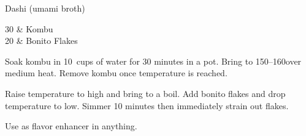 
\begin{recipe}{Dashi (umami broth)}\label{dashi}
  \servings{}
  \maketitle

  \begin{ingredients2}
    30 \g & Kombu\\
    20 \g & Bonito Flakes
  \end{ingredients2}

  Soak kombu in 10~cups of water for 30 minutes in a pot. Bring to
  150\degF--160\degF over medium heat. Remove kombu once temperature is
  reached.

  Raise temperature to high and bring to a boil. Add bonito flakes and drop
  temperature to low. Simmer 10 minutes then immediately strain out flakes.

  Use as flavor enhancer in anything.
\end{recipe}


